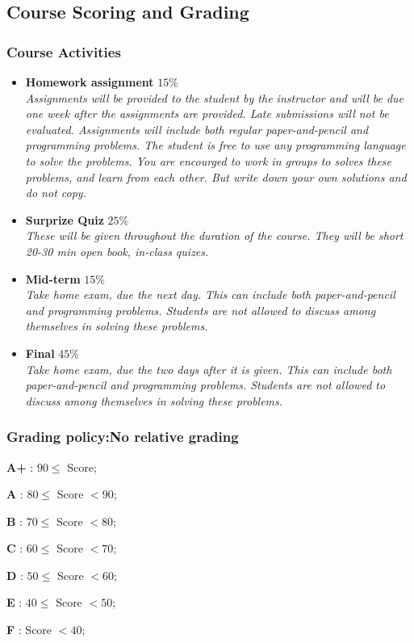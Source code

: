 \documentclass[fontsize=9pt]{scrbook}
\begin{document}
\begin{multicols}{2}
\subsection*{Course Scoring and Grading}
\subsubsection*{Course Activities}
\begin{itemize}
\item \textbf{Homework assignment} $15\%$\\
\textit{\small Assignments will be provided to the student by the instructor and will be due one week after the assignments are provided. Late submissions will not be evaluated. Assignments will include both regular paper-and-pencil and programming problems. The student is free to use any programming language to solve the problems. You are encourged to work in groups to solves these problems, and learn from each other. But write down your own solutions and do not copy.}
\item \textbf{Surprize Quiz} $25\%$\\
\textit{\small These will be given throughout the duration of the course. They will be short 20-30 min open book, in-class quizes.}
\item \textbf{Mid-term} $15\%$\\
\textit{\small Take home exam, due the next day. This can include both paper-and-pencil and programming problems. Students are not allowed to discuss among themselves in solving these problems.}
\item \textbf{Final} $45\%$\\
\textit{\small Take home exam, due the two days after it is given. This can include both paper-and-pencil and programming problems. Students are not allowed to discuss among themselves in solving these problems.}
\end{itemize}

\subsubsection*{Grading policy:No relative grading}
\begin{enumerate*}
\item[\textbf{A+}]: {\small $90 \leq$ Score;}
\item[\textbf{A}]: {\small $80 \leq$ Score $< 90$;}
\item[\textbf{B}]: {\small $70 \leq$ Score $< 80$;}
\item[\textbf{C}]: {\small $60 \leq$ Score $< 70$;}
\item[\textbf{D}]: {\small $50 \leq$ Score $< 60$;}
\item[\textbf{E}]: {\small $40 \leq$ Score $< 50$;}
\item[\textbf{F}]: {\small Score $< 40$;}
\end{enumerate*}


\end{multicols}
\end{document}
